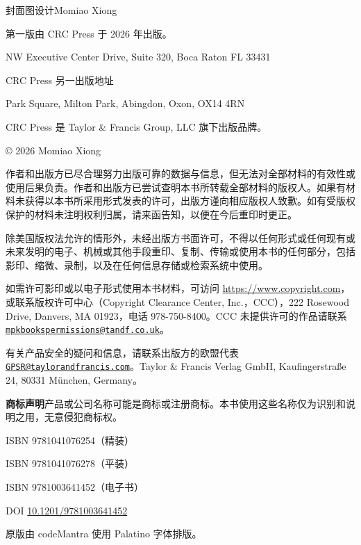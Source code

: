 \thispagestyle{empty}
{\small
\noindent 封面图设计\quad Momiao Xiong\par
\medskip
\noindent 第一版由 CRC Press 于 2026 年出版。\par
{} NW Executive Center Drive, Suite 320, Boca Raton FL 33431\par
\noindent CRC Press 另一出版地址\par
{} Park Square, Milton Park, Abingdon, Oxon, OX14 4RN\par
\noindent CRC Press 是 Taylor \& Francis Group, LLC 旗下出版品牌。\par
\medskip
\noindent © 2026 Momiao Xiong\par
\medskip

作者和出版方已尽合理努力出版可靠的数据与信息，但无法对全部材料的有效性或使用后果负责。作者和出版方已尝试查明本书所转载全部材料的版权人。如果有材料未获得以本书所采用形式发表的许可，出版方谨向相应版权人致歉。如有受版权保护的材料未注明权利归属，请来函告知，以便在今后重印时更正。

除美国版权法允许的情形外，未经出版方书面许可，不得以任何形式或任何现有或未来发明的电子、机械或其他手段重印、复制、传输或使用本书的任何部分，包括影印、缩微、录制，以及在任何信息存储或检索系统中使用。

如需许可影印或以电子形式使用本书材料，可访问 \url{https://www.copyright.com}，或联系版权许可中心（Copyright Clearance Center, Inc.，CCC），222 Rosewood Drive, Danvers, MA 01923，电话 978-750-8400。CCC 未提供许可的作品请联系 \href{mailto:mpkbookspermissions@tandf.co.uk}{\nolinkurl{mpkbookspermissions@tandf.co.uk}}。

有关产品安全的疑问和信息，请联系出版方的欧盟代表 \href{mailto:GPSR@taylorandfrancis.com}{\nolinkurl{GPSR@taylorandfrancis.com}}。Taylor \& Francis Verlag GmbH, Kaufingerstraße 24, 80331 München, Germany。

\noindent\textbf{商标声明}\quad 产品或公司名称可能是商标或注册商标。本书使用这些名称仅为识别和说明之用，无意侵犯商标权。\par
\medskip
\noindent ISBN 9781041076254（精装）\par
\noindent ISBN 9781041076278（平装）\par
\noindent ISBN 9781003641452（电子书）\par
\noindent DOI \href{https://doi.org/10.1201/9781003641452}{10.1201/9781003641452}\par
\medskip
\noindent 原版由 codeMantra 使用 Palatino 字体排版。\par
}
\clearpage

